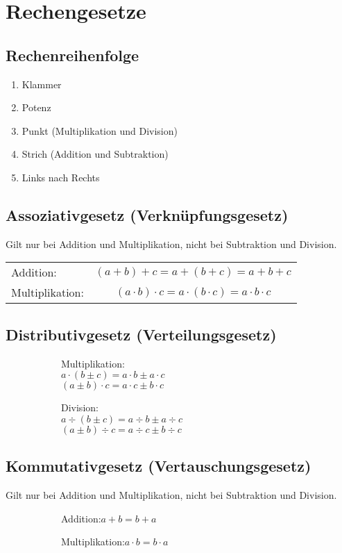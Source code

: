 \documentclass[11pt,a4paper,oneside]{article}
\newcommand{\sidebysideB}[2]{
\begin{figure}[H]
\begin{subfigure}[t]{0.5\linewidth}
#1
\end{subfigure}%
\begin{subfigure}[t]{0.5\linewidth}
#2
\end{subfigure}
\end{figure}
}
\begin{document}
\section{Rechengesetze}
\subsection{Rechenreihenfolge}
\begin{enumerate}
\item Klammer
\item Potenz
\item Punkt (Multiplikation und Division)
\item Strich (Addition und Subtraktion)
\item Links nach Rechts
\end{enumerate}

\newpage
\subsection{Assoziativgesetz (Verknüpfungsgesetz)}
Gilt nur bei Addition und Multiplikation, nicht bei Subtraktion und Division.\\
\vspace{-2em}
\begin{table}[h]
\begin{tabular}{@{}lc}
\rule{0pt}{1em}Addition: & $\left(a+b\right)+c=a+\left(b+c\right)=a+b+c$\\
\rule{0pt}{1em}Multiplikation: & $\left(a\cdot b\right)\cdot c=a\cdot \left(b\cdot c\right)=a\cdot b\cdot c$
\end{tabular}
\end{table}
\vspace{-1.5em}

\subsection{Distributivgesetz (Verteilungsgesetz)}
\vspace{-1em}
\sidebysideB{
Multiplikation:\\
$a\cdot\left(b\pm c\right)=a\cdot b\pm a\cdot c$\\
$\left(a\pm b\right)\cdot c=a\cdot c\pm b\cdot c$
}{
Division:\\
\sout{$a\div\left(b\pm c\right)=a\div b\pm a\div c$}\\
$\left(a\pm b\right)\div c=a\div c\pm b\div c$\quad{\footnotesize (s. \ref{Bruchgesetze}: Add/Sub)}
}
\subsection{Kommutativgesetz (Vertauschungsgesetz)}
Gilt nur bei Addition und Multiplikation, nicht bei Subtraktion und Division.
\sidebysideB{Addition:\qquad$a+b=b+a$}{Multiplikation:\qquad$a\cdot b=b\cdot a$}
\end{document}
